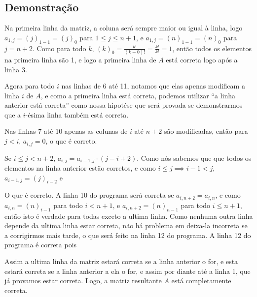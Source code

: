 \documentclass[a4paper, 10pt]{article}
\begin{document}
\subsection{Demonstra\c{c}\~ao}

Na primeira linha da matriz, a coluna ser\'a sempre maior ou igual \`a linha, logo 
$a_{1,j} = (j)_{1-1} = (j)_0$ para $1 \leq j \leq n+1$, e $a_{1,j} = (n)_{1-1} = (n)_0$
para $j = n+2$. Como para todo $k$, $(k)_0 = \frac{k!}{(k - 0 )!} = \frac{k!}{k!} = 1$,
ent\~ao todos os elementos na primeira linha s\~ao 1, e logo a primeira linha de $A$ est\'a
correta logo ap\'os a linha 3.

Agora para todo $i$ nas linhas de 6 at\'e 11, notamos que elas apenas modificam a linha $i$
de $A$, e como a primeira linha est\'a correta, podemos utilizar ``a linha anterior est\'a correta''
como nossa hipot\'ese que ser\'a provada se demonstrarmos que a $i$-\'esima linha tamb\'em
est\'a correta.

Nas linhas 7 at\'e 10 apenas as colunas de $i$ at\'e $n + 2$ s\~ao modificadas, ent\~ao para
$j < i$, $a_{i,j} = 0$, o que \'e correto.

Se $i \leq j < n + 2$, $a_{i,j} = a_{i-1, j} \cdot (j - i + 2)$. Como n\'os sabemos que que
todos os elementos na linha anterior est\~ao corretos, e como $i \leq j \implies i - 1 < j$,
$a_{i-1, j} = (j)_{i-2}$ e

\algorithmIthRow

O que \'e correto. A linha 10 do programa ser\'a correta se $a_{i,n+2} = a_{i,n}$, e como
$a_{i,n} = (n)_{i-1}$ para todo $i < n+1$, e $a_{i,n+2} = (n)_{n-1}$ para todo $i \leq n+1$,
ent\~ao isto \'e verdade para todas exceto a ultima linha. Como nenhuma outra linha depende
da ultima linha estar correta, n\~ao h\'a problema em deixa-la incorreta se a corrigirmos
mais tarde, o que ser\'a feito na linha 12 do programa. A linha 12 do programa \'e correta
pois
\algorithmLast

Assim a ultima linha da matriz estar\'a correta se a linha anterior o for, e esta estar\'a
correta se a linha anterior a ela o for, e assim por diante at\'e a linha 1, que j\'a provamos
estar correta. Logo, a matriz resultante $A$ est\'a completamente correta.
\end{document}
